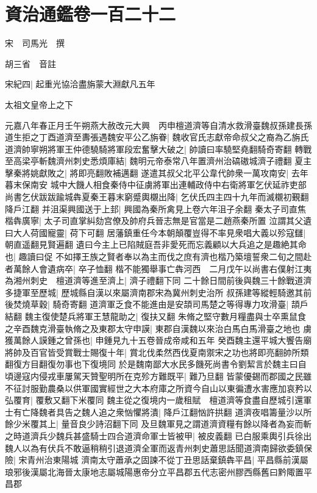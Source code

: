 \chapter{資治通鑑卷一百二十二}
宋　司馬光　撰

胡三省　音註

宋紀四|{
	起重光協洽盡旃蒙大淵獻凡五年}


太祖文皇帝上之下

元嘉八年春正月壬午朔燕大赦改元大興　丙申檀道濟等自清水救滑臺魏叔孫建長孫道生拒之丁酉道濟至夀張遇魏安平公乙旃眷|{
	魏收官氏志獻帝命叔父之裔為乙旃氏}
道濟帥寧朔將軍王仲德驍騎將軍段宏奮擊大破之|{
	帥讀曰率驍堅堯翻騎奇寄翻}
轉戰至高梁亭斬魏濟州刺史悉煩庫結|{
	魏明元帝泰常八年置濟州治碻磝城濟子禮翻}
夏主擊秦將姚獻敗之|{
	將即亮翻敗補邁翻}
遂遣其叔父北平公韋代帥衆一萬攻南安|{
	去年暮末保南安}
城中大饑人相食秦侍中征虜將軍出連輔政侍中右衛將軍乞伏延祚吏部尚書乞伏跋跋踰城犇夏秦王暮末窮蹙輿櫬出降|{
	乞伏氏四主四十九年而滅櫬初覲翻降戶江翻}
并沮渠興國送于上邽|{
	興國為秦所禽見上卷六年沮子余翻}
秦太子司直焦楷犇廣寧|{
	太子司直掌糾劾宫僚及帥府兵晉志無是官當是二趙燕秦所置}
泣謂其父遺曰大人荷國寵靈|{
	荷下可翻}
居藩鎮重任今本朝顛覆豈得不率見衆唱大義以殄寇讎|{
	朝直遥翻見賢遍翻}
遺曰今主上已陷賊庭吾非愛死而忘義顧以大兵追之是趣絶其命也|{
	趣讀曰促}
不如擇王族之賢者奉以為主而伐之庶有濟也楷乃築壇誓衆二旬之間赴者萬餘人會遺病卒|{
	卒子恤翻}
楷不能獨舉事亡犇河西　二月戊午以尚書右僕射江夷為湘州刺史　檀道濟等進至濟上|{
	濟子禮翻下同}
二十餘日間前後與魏三十餘戰道濟多捷軍至歷城|{
	歷城縣自漢以來屬濟南郡宋為冀州刺史治所}
叔孫建等縱輕騎邀其前後焚燒草穀|{
	騎奇寄翻}
道濟軍乏食不能進由是安頡司馬楚之等得專力攻滑臺|{
	頡戶結翻}
魏主復使楚兵將軍王慧龍助之|{
	復扶又翻}
朱脩之堅守數月糧盡與士卒熏鼠食之辛酉魏克滑臺執脩之及東郡太守申謨|{
	東郡自漢魏以來治白馬白馬滑臺之地也}
虜獲萬餘人謨鍾之曾孫也|{
	申鍾見九十五卷晉成帝咸和五年}
癸酉魏主還平城大饗告廟將帥及百官皆受賞戰士賜復十年|{
	賞北伐柔然西伐夏南禦宋之功也將即亮翻帥所類翻復方目翻復勿事也下復境同}
於是魏南鄙大水民多饑死尚書令劉絜言於魏主曰自頃邊寇内侵戎車屢駕天贊聖明所在克殄方難既平|{
	難乃旦翻}
皆蒙優錫而郡國之民雖不征討服勤農桑以供軍國實經世之大本府庫之所資今自山以東徧遭水害應加哀矜以弘覆育|{
	覆敷又翻下米覆同}
魏主從之復境内一歲租賦　檀道濟等食盡自歷城引還軍士有亡降魏者具告之魏人追之衆忷懼將潰|{
	降戶江翻忷許拱翻}
道濟夜唱籌量沙以所餘少米覆其上|{
	量音良少詩沼翻下同}
及旦魏軍見之謂道濟資糧有餘以降者為妄而斬之時道濟兵少魏兵甚盛騎士四合道濟命軍士皆被甲|{
	被皮義翻}
已白服乘輿引兵徐出魏人以為有伏兵不敢逼稍稍引退道濟全軍而返青州刺史蕭思話聞道濟南歸欲委鎮保險|{
	宋青州治東陽城}
濟南太守蕭承之固諫不從丁丑思話棄鎮犇平昌|{
	平昌縣前漢屬琅邪後漢屬北海晉太康地志屬城陽惠帝分立平昌郡五代志密州膠西縣舊曰黔陬置平昌郡}
